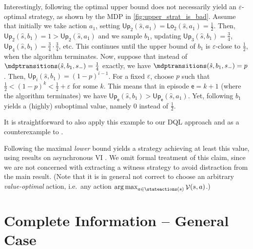 \documentclass{theoretics}
\DeclareMathOperator*{\argmax}{arg\,max}
\newcommand{\initialstate}{\hat{s}}
\DeclareMathOperator{\val}{\mathcal{V}}
\newcommand{\upperbound}{\mathsf{Up}}
\newcommand{\lowerbound}{\mathsf{Lo}}
\newcommand{\sinkstate}{s_-}
\newcommand{\algoepisode}{\mathsf{e}}
\begin{document}
\begin{example} \label{exa:upper_strat_is_bad}
	Interestingly, following the optimal upper bound does not necessarily yield an $\varepsilon$-optimal strategy, as shown by the MDP in \cref{fig:upper_strat_is_bad}.
	Assume that initially we take action $a_1$, setting $\upperbound_2(\initialstate, a_1) = \lowerbound_2(\initialstate, a_1) = \frac{1}{2}$.
	Then, $\upperbound_2(\initialstate, b_1) = 1 > \upperbound_2(\initialstate, a_1)$ and we sample $b_1$, updating $\upperbound_3(\initialstate, b_1) = \frac{3}{4}$,  $\upperbound_4(\initialstate, b_1) = \frac{3}{4} \cdot \frac{3}{4}$, etc.
	This continues until the upper bound of $b_1$ is $\varepsilon$-close to $\frac{1}{2}$, when the algorithm terminates.
	Now, suppose that instead of $\mdptransitions(\initialstate, b_1, \sinkstate) = \frac{1}{4}$ exactly, we have $\mdptransitions(\initialstate, b_1, \sinkstate) = p$.
	Then, $\upperbound_i(\initialstate, b_1) = (1 - p)^{i - 1}$.
	For a fixed $\varepsilon$, choose $p$ such that $\frac{1}{2} < (1-p)^k < \frac{1}{2} + \varepsilon$ for some $k$.
	This means that in episode $\algoepisode = k + 1$ (where the algorithm terminates) we have $\upperbound_{\algoepisode}(\initialstate, b_1) > \upperbound_{\algoepisode}(\initialstate, a_1)$.
	Yet, following $b_1$ yields a (highly) suboptimal value, namely $0$ instead of $\frac{1}{2}$.

	It is straightforward to also apply this example to our DQL approach and as a counterexample to \cite[Lemma~16]{DBLP:conf/atva/BrazdilCCFKKPU14}.  
\end{example}
Following the maximal \emph{lower} bound yields a strategy achieving at least this value, using results on asynchronous VI \cite{DBLP:books/wi/Puterman94}.
We omit formal treatment of this claim, since we are not concerned with extracting a witness strategy to avoid distraction from the main result.
(Note that it is in general not correct to choose an arbitrary \emph{value-optimal} action, i.e.\ any action $\argmax_{a \in \stateactions(s)} \val(s, a)$.)
 	\section{Complete Information -- General Case} \label{sec:brtdp}
\end{document}
